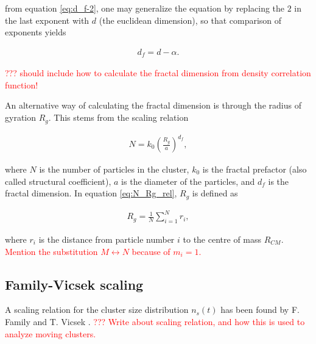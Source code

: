 from equation \eqref{eq:d_f-2}, one may generalize the equation by replacing the $2$ in the last exponent with $d$ (the euclidean dimension), so that comparison of exponents yields 

\begin{align}
d_f = d - \alpha.
\label{eq:d_f corr}
\end{align}

\textcolor{red}{??? should include how to calculate the fractal dimension from density correlation function!}

An alternative way of calculating the fractal dimension is through the radius of gyration $R_g$. This stems from the scaling relation 

\begin{align}
N = k_0\left(\frac{R_g}{a}\right)^{d_f},
\label{eq:N_Rg_rel}
\end{align}

where $N$ is the number of particles in the cluster, $k_0$ is the fractal prefactor (also called structural coefficient), $a$ is the diameter of the particles, and $d_f$ is the fractal dimension. In equation \eqref{eq:N_Rg_rel}, $R_g$ is defined as 

\begin{align}
R_g = \frac{1}{N} \sum_{i=1}^{N} r_i, 
\end{align}

where $r_i$ is the distance from particle number $i$ to the centre of mass $R_{CM}$. \textcolor{red}{Mention the substitution $M \leftrightarrow N$ because of $m_i = 1$. }

\subsection{Family-Vicsek scaling}
A scaling relation for the cluster size distribution $n_s(t)$ has been found by F. Family and T. Vicsek \cite{PhysRevLett.52.1669}. \textcolor{red}{??? Write about scaling relation, and how this is used to analyze moving clusters.}